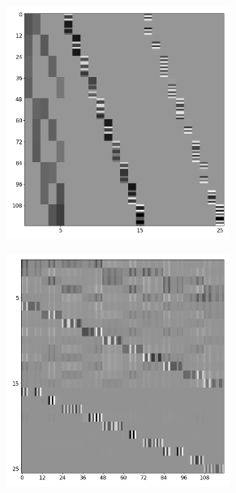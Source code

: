 \begin{figure}[ht!]
    \begin{subfigure}{0.5\textwidth}
        \centering
        \includegraphics[width=0.8\textwidth]{Figure_Chap3/20221010_V2PM_Pola1_706nm.png}
    \end{subfigure}%
    \begin{subfigure}{0.5\textwidth}
        \centering
        \includegraphics[width=0.8\textwidth]{Figure_Chap3/20221010_P2VM_Pola1_706nm.png}
    \end{subfigure}

\end{figure}
